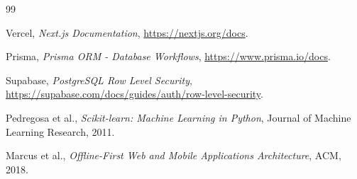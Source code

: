 \documentclass[12pt,a4paper]{report}
\begin{document}
\begin{thebibliography}{99}

Vercel, \emph{Next.js Documentation}, \url{https://nextjs.org/docs}.

Prisma, \emph{Prisma ORM - Database Workflows}, \url{https://www.prisma.io/docs}.

Supabase, \emph{PostgreSQL Row Level Security}, \url{https://supabase.com/docs/guides/auth/row-level-security}.

Pedregosa et al., \emph{Scikit-learn: Machine Learning in Python}, Journal of Machine Learning Research, 2011.

Marcus et al., \emph{Offline-First Web and Mobile Applications Architecture}, ACM, 2018.

\end{thebibliography}
\end{document}
